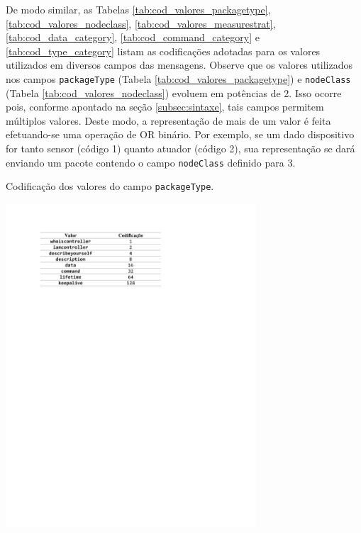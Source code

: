 De modo similar, as Tabelas \ref{tab:cod_valores_packagetype}, \ref{tab:cod_valores_nodeclass}, \ref{tab:cod_valores_measurestrat}, \ref{tab:cod_data_category}, \ref{tab:cod_command_category} e \ref{tab:cod_type_category} listam as codificações adotadas para os valores utilizados em diversos campos das mensagens. Observe que os valores utilizados nos campos \texttt{packageType} (Tabela \ref{tab:cod_valores_packagetype}) e \texttt{nodeClass} (Tabela \ref{tab:cod_valores_nodeclass}) evoluem em potências de 2. Isso ocorre pois, conforme apontado na seção \ref{subsec:sintaxe}, tais campos permitem múltiplos valores. Deste modo, a representação de mais de um valor é feita efetuando-se uma operação de OR binário. Por exemplo, se um dado dispositivo for tanto sensor (código 1) quanto atuador (código 2), sua representação se dará enviando um pacote contendo o campo \texttt{nodeClass} definido para 3.

\begin{table}[hp]
	\centering
	\caption{Codificação dos valores do campo \texttt{packageType}.}\smallskip
	\label{tab:cod_valores_packagetype}
	\includegraphics[width=0.7\textwidth]{tabelas/cod_valores_packagetype.pdf}
\end{table}

